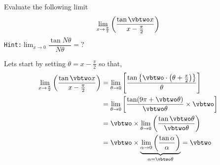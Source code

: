 

\MULTIPLY{}\vbtwo

\question[4] Evaluate the following limit \[ \lim_{x\to\frac\pi{2}}\left(\dfrac{\tan\vbtwo x}{x-\frac{\pi}{2}}\right)\]
\texttt{Hint:}$\lim_{x\to 0}\dfrac{\tan N\theta}{N\theta} = ?$

\begin{solution}[\halfpage]
  Lets start by setting $\theta = x - \frac{\pi}{2}$ so that,
  \begin{align}
    \lim_{x\to\frac\pi{2}}\left( \dfrac{\tan\vbtwo x}{x-\frac\pi{2}}\right) &= 
    \lim_{\theta\to 0}\left[ 
    \dfrac{\tan\left\lbrace\vbtwo\cdot\left( \theta + \frac\pi{2} \right)\right\rbrace}{\theta}
    \right] \\
    &= \lim_{\theta\to 0}\left[ \dfrac{\tan (\vbone\pi + \vbtwo\theta)}{\vbtwo\theta} \times\vbtwo\right] \\
    &= \vbtwo\times\lim_{\theta\to 0}\left( 
    \dfrac{\tan\vbtwo\theta}{\vbtwo\theta}\right) \\
    &= \vbtwo\times\underbrace{\lim_{\alpha\to 0}\left( \dfrac{\tan\alpha}{\alpha}\right)}_{\alpha=\vbtwo\theta} = \vbtwo
  \end{align}

\end{solution}

